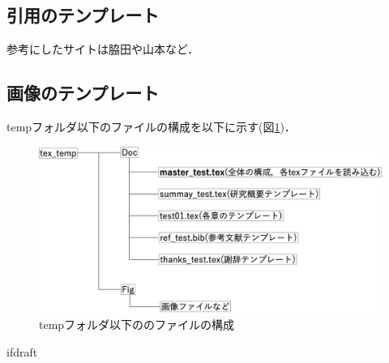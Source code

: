 \subsection{引用のテンプレート}
参考にしたサイトは脇田\cite{tex_ref02}や山本\cite{tex_ref01}など．\par

\subsection{画像のテンプレート}
tempフォルダ以下のファイルの構成を以下に示す(図\ref{fig:img_temp})．
\begin{figure}[H]
  \begin{center}
    \includegraphics[keepaspectratio, scale=0.2]{../Fig/img_temp.png}
    \caption{tempフォルダ以下ののファイルの構成}
    \label{fig:img_temp}
  \end{center}
\end{figure}

\expandafter\ifx\csname ifdraft\endcsname\relax
  
\fi
